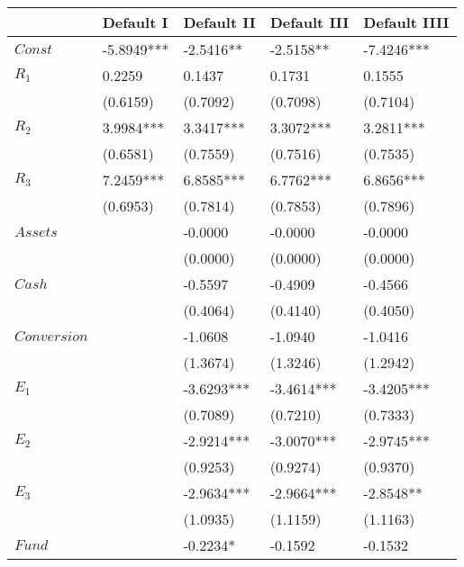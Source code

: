 \begin{table}
	\caption{Logit 模型回归结果\label{tab:Logitresult}}
	\begin{center}
		\begin{longtable}{lllll}
			\hline
			                & Default I  & Default II & Default III & Default IIII \\
			\hline
			\(Const\)       & -5.8949*** & -2.5416**  & -2.5158**   & -7.4246***   \\
			\(R_1\)         & 0.2259     & 0.1437     & 0.1731      & 0.1555       \\
			                & (0.6159)   & (0.7092)   & (0.7098)    & (0.7104)     \\
			\(R_2\)         & 3.9984***  & 3.3417***  & 3.3072***   & 3.2811***    \\
			                & (0.6581)   & (0.7559)   & (0.7516)    & (0.7535)     \\
			\(R_3\)         & 7.2459***  & 6.8585***  & 6.7762***   & 6.8656***    \\
			                & (0.6953)   & (0.7814)   & (0.7853)    & (0.7896)     \\
			\(Assets\)      &            & -0.0000    & -0.0000     & -0.0000      \\
			                &            & (0.0000)   & (0.0000)    & (0.0000)     \\
			\(Cash\)        &            & -0.5597    & -0.4909     & -0.4566      \\
			                &            & (0.4064)   & (0.4140)    & (0.4050)     \\
			\(Conversion\)  &            & -1.0608    & -1.0940     & -1.0416      \\
			                &            & (1.3674)   & (1.3246)    & (1.2942)     \\
			\(E_1\)         &            & -3.6293*** & -3.4614***  & -3.4205***   \\
			                &            & (0.7089)   & (0.7210)    & (0.7333)     \\
			\(E_2\)         &            & -2.9214*** & -3.0070***  & -2.9745***   \\
			                &            & (0.9253)   & (0.9274)    & (0.9370)     \\
			\(E_3\)         &            & -2.9634*** & -2.9664***  & -2.8548**    \\
			                &            & (1.0935)   & (1.1159)    & (1.1163)     \\
			\(Fund\)        &            & -0.2234*   & -0.1592     & -0.1532      \\

\end{longtable}
\end{center}
\end{table}
